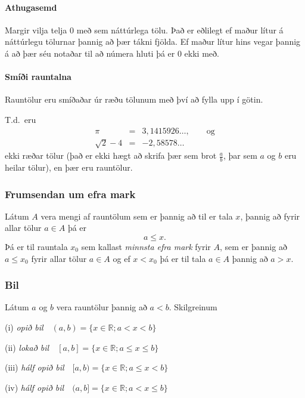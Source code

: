 \documentclass[icelandic,a4paper,12pt]{article}
\newcommand{\R}{{\mathbb  R}}
\begin{document}
\pause

\paragraph{Athugasemd}  
Margir vilja telja $0$ með sem náttúrlega tölu.  Það er eðlilegt ef 
maður lítur á náttúrlegu tölurnar þannig að þær tákni fjölda.  Ef maður lítur hins vegar þannig
á að þær séu notaðar til að númera hluti
þá er 0 ekki með.





\paragraph{Smíði rauntalna}  Rauntölur eru smíðaðar úr ræðu tölunum
með því að fylla upp í götin. 

\pause

T.d.~eru 
\begin{eqnarray*}
\pi &=& 3,1415926\ldots, \qquad \text{og}\\
\sqrt 2 -4  &=& -2,58578\ldots
\end{eqnarray*}
ekki ræðar tölur (það er ekki hægt að skrifa þær sem brot $\frac ab$, 
þar sem $a$ og $b$ eru heilar tölur), en þær eru rauntölur.


\pause


\subsubsection*{Frumsendan um efra mark}  
Látum $A$ vera mengi af  rauntölum
sem er þannig að til er tala $x$, þannig að 
fyrir allar tölur $a \in A$ þá er 
$$a\leq x.$$ 
Þá er til rauntala $x_0$ sem kallast {\em minnsta efra mark} fyrir
$A$, sem er þannig að  $a\leq x_0$ fyrir allar tölur $a\in
A$ og ef $x<x_0$ þá er til tala $a\in A$ þannig að $a>x$.  




\subsubsection*{Bil}
Látum $a$ og $b$ vera rauntölur þannig að $a<b$.  
Skilgreinum 

(i) {\em opið bil}\ \ $(a,b)=\{x\in \R ; a<x<b\}$

(ii) {\em lokað bil}\ \ $[a,b]=\{x\in \R ; a\leq x\leq b\}$

(iii) {\em hálf opið bil}\ \ $[a,b)=\{x\in \R ; a\leq x<b\}$

(iv) {\em hálf opið bil}\ \ $(a,b]=\{x\in \R ; a< x\leq b\}$
\end{document}
